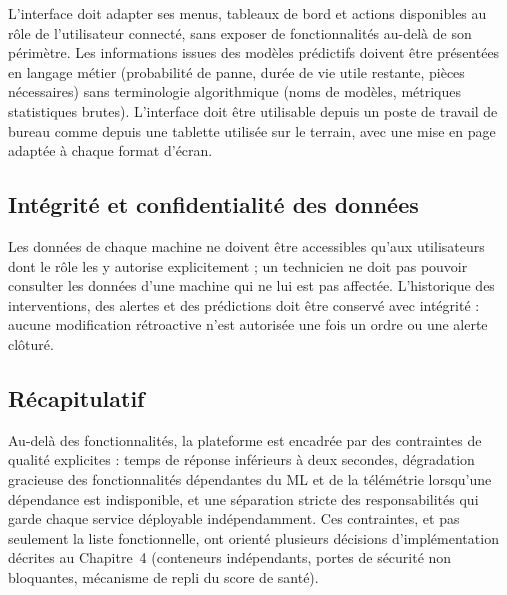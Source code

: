 L'interface doit adapter ses menus, tableaux de bord et actions disponibles au rôle de l'utilisateur connecté, sans exposer de fonctionnalités au-delà de son périmètre.
Les informations issues des modèles prédictifs doivent être présentées en langage métier (probabilité de panne, durée de vie utile restante, pièces nécessaires) sans terminologie algorithmique (noms de modèles, métriques statistiques brutes).
L'interface doit être utilisable depuis un poste de travail de bureau comme depuis une tablette utilisée sur le terrain, avec une mise en page adaptée à chaque format d'écran.

\subsection{Intégrité et confidentialité des données}

Les données de chaque machine ne doivent être accessibles qu'aux utilisateurs dont le rôle les y autorise explicitement ; un technicien ne doit pas pouvoir consulter les données d'une machine qui ne lui est pas affectée.
L'historique des interventions, des alertes et des prédictions doit être conservé avec intégrité : aucune modification rétroactive n'est autorisée une fois un ordre ou une alerte clôturé.

\subsection{Récapitulatif}

Au-delà des fonctionnalités, la plateforme est encadrée par des contraintes de qualité explicites : temps de réponse inférieurs à deux secondes, dégradation gracieuse des fonctionnalités dépendantes du ML et de la télémétrie lorsqu'une dépendance est indisponible, et une séparation stricte des responsabilités qui garde chaque service déployable indépendamment. Ces contraintes, et pas seulement la liste fonctionnelle, ont orienté plusieurs décisions d'implémentation décrites au Chapitre~4 (conteneurs indépendants, portes de sécurité non bloquantes, mécanisme de repli du score de santé).

